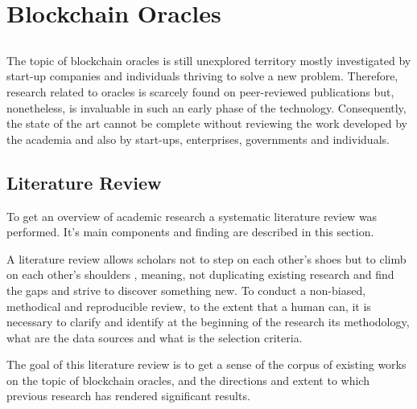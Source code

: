 \chapter{Blockchain Oracles} \label{chap:sota}

\section*{}



The topic of blockchain oracles is still unexplored territory mostly investigated by start-up companies and individuals thriving to solve a new problem. Therefore, research related to oracles is scarcely found on peer-reviewed publications but, nonetheless, is invaluable in such an early phase of the technology. Consequently, the state of the art cannot be complete without reviewing the work developed by the academia and also by start-ups, enterprises, governments and individuals.

\section{Literature Review}

To get an overview of academic research a systematic literature review was performed. It's main components and finding are described in this section.

A literature review allows scholars not to step on each other's shoes but to climb on each other's shoulders \cite{Kitchenham2007GuidelinesEngineering}, meaning, not duplicating existing research and find the gaps and strive to discover something new. To conduct a non-biased, methodical and reproducible review, to the extent that a human can, it is necessary to clarify and identify at the beginning of the research its methodology, what are the data sources and what is the selection criteria.

The goal of this literature review is to get a sense of the corpus of existing works on the topic of blockchain oracles, and the directions and extent to which previous research has rendered significant results.

